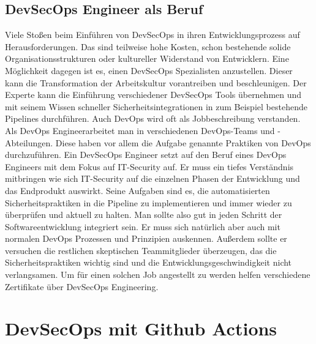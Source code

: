 \section{DevSecOps Engineer als Beruf}
Viele Stoßen beim Einführen von DevSecOps in ihren Entwicklungsprozess auf Herausforderungen. Das sind teilweise hohe Kosten, schon bestehende solide Organisationsstrukturen oder kultureller Widerstand von Entwicklern. Eine Möglichkeit dagegen ist es, einen DevSecOps Spezialisten anzustellen. Dieser kann die Transformation der Arbeitskultur vorantreiben und beschleunigen. Der Experte kann die Einführung verschiedener DevSecOps Tools übernehmen und mit seinem Wissen schneller Sicherheitsintegrationen in zum Beispiel bestehende Pipelines durchführen. \cite{grey}
Auch DevOps wird oft als Jobbeschreibung verstanden. Als \glqq DevOps Engineer\grqq arbeitet man in verschiedenen DevOps-Teams und -Abteilungen. Diese haben vor allem die Aufgabe genannte Praktiken von DevOps durchzuführen. \cite{dev-ops}
Ein DevSecOps Engineer setzt auf den Beruf eines DevOps Engineers mit dem Fokus auf IT-Security auf. Er muss ein tiefes Verständnis mitbringen wie sich IT-Security auf die einzelnen Phasen der Entwicklung und das Endprodukt auswirkt. Seine Aufgaben sind es, die automatisierten Sicherheitspraktiken in die Pipeline zu implementieren und immer wieder zu überprüfen und aktuell zu halten. Man sollte also gut in jeden Schritt der Softwareentwicklung integriert sein. Er muss sich natürlich aber auch mit normalen DevOps Prozessen und Prinzipien auskennen. Außerdem sollte er versuchen die restlichen skeptischen Teammitglieder überzeugen, das die Sicherheitspraktiken wichtig sind und die Entwicklungsgeschwindigkeit nicht verlangsamen. Um für einen solchen Job angestellt zu werden helfen verschiedene Zertifikate über DevSecOps Engineering. \cite{Cobb2019-lq}

\chapter{DevSecOps mit Github Actions}

